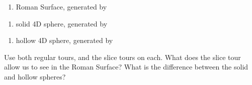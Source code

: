 \documentclass[
  letterpaper,
]{krantz}
\newenvironment{Shaded}{\begin{snugshade}}{\end{snugshade}}
\newcommand{\DecValTok}[1]{\textcolor[rgb]{0.68,0.00,0.00}{#1}}
\newcommand{\FunctionTok}[1]{\textcolor[rgb]{0.28,0.35,0.67}{#1}}
\newcommand{\NormalTok}[1]{\textcolor[rgb]{0.00,0.23,0.31}{#1}}
\newcommand{\OtherTok}[1]{\textcolor[rgb]{0.00,0.23,0.31}{#1}}
\newcommand{\SpecialCharTok}[1]{\textcolor[rgb]{0.37,0.37,0.37}{#1}}
\providecommand{\tightlist}{%
  \setlength{\itemsep}{0pt}\setlength{\parskip}{0pt}}
\begin{document}
\begin{enumerate}
\def\labelenumi{\alph{enumi}.}
\tightlist
\item
  Roman Surface, generated by
\end{enumerate}

\begin{Shaded}
\end{Shaded}

\begin{enumerate}
\def\labelenumi{\alph{enumi}.}
\setcounter{enumi}{1}
\tightlist
\item
  solid 4D sphere, generated by
\end{enumerate}

\begin{Shaded}
\end{Shaded}

\begin{enumerate}
\def\labelenumi{\alph{enumi}.}
\setcounter{enumi}{2}
\tightlist
\item
  hollow 4D sphere, generated by
\end{enumerate}

\begin{Shaded}
\end{Shaded}

Use both regular tours, and the slice tours on each. What does the slice
tour allow us to see in the Roman Surface? What is the difference
between the solid and hollow spheres?
\end{document}
